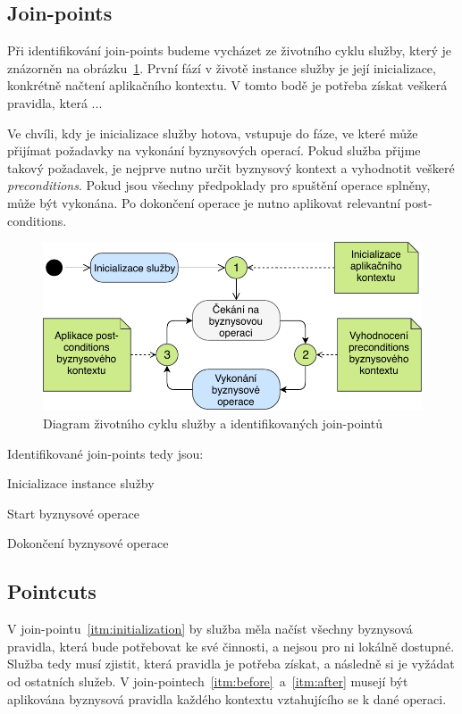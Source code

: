 \subsection{Join-points}

Při identifikování join-points budeme vycházet ze životního cyklu služby, který je znázorněn
na obrázku~\ref{fig:join-points}. První fází v životě instance služby je její inicializace,
konkrétně načtení aplikačního kontextu. V tomto bodě je potřeba získat veškerá pravidla, která ... %

Ve chvíli, kdy je inicializace služby hotova, vstupuje do fáze, ve které může přijímat požadavky
na vykonání byznysových operací. Pokud služba přijme takový požadavek, je nejprve nutno určit
byznysový kontext a vyhodnotit veškeré \textit{preconditions}. Pokud jsou všechny předpoklady
pro spuštění operace splněny, může být vykonána. Po dokončení operace je nutno aplikovat relevantní
post-conditions.

\begin{figure}
    \centering
    \includegraphics[keepaspectratio=true, width=0.8\linewidth]{figures/join-points.pdf}
    \caption{Diagram životn\'{\i}ho cyklu služby a identifikovan\'ych join-pointů}
    \label{fig:join-points}
\end{figure}

Identifikované join-points tedy jsou:

\benum[label=\circledarabic]
\item\label{itm:initialization} Inicializace instance služby
\item\label{itm:before} Start byznysové operace
\item\label{itm:after} Dokončení byznysové operace
\eenum

\subsection{Pointcuts}

V join-pointu~\ref{itm:initialization} by služba měla načíst všechny byznysová pravidla, která
bude potřebovat ke své činnosti, a nejsou pro ni lokálně dostupné. Služba tedy musí zjistit,
která pravidla je potřeba získat, a následně si je vyžádat od ostatních služeb.
V join-pointech~\ref{itm:before}~a~\ref{itm:after} musejí být aplikována byznysová pravidla každého
kontextu vztahujícího se k dané operaci.

